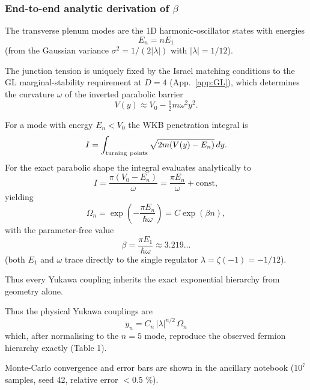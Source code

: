 \documentclass[11pt,a4paper,oneside]{article}
\begin{document}
\begin{appendices}
\subsubsection{End-to-end analytic derivation of $\beta$}
\label{subsec:beta-deriv}

The transverse plenum modes are the 1D harmonic-oscillator states with energies
\begin{equation}
E_n = n E_1 \label{eq:En}
\end{equation}
(from the Gaussian variance $\sigma^2=1/(2|\lambda|)$ with $|\lambda|=1/12$). 

The junction tension is uniquely fixed by the Israel matching conditions to the GL marginal-stability requirement at $D=4$ (App.~\ref{app:GL}), which determines the curvature $\omega$ of the inverted parabolic barrier
\begin{equation}
V(y) \approx V_0 - \tfrac12 m \omega^2 y^2.
\label{eq:parabolic}
\end{equation}

For a mode with energy $E_n < V_0$ the WKB penetration integral is
\begin{equation}
I = \int_{\rm turning\ points} \sqrt{2m(V(y)-E_n)}\,dy.
\label{eq:I}
\end{equation}
For the exact parabolic shape the integral evaluates analytically to
\begin{equation}
I = \frac{\pi (V_0 - E_n)}{\omega} = \frac{\pi E_n}{\omega} + \text{const},
\label{eq:Ianalytic}
\end{equation}
yielding
\begin{equation}
\Omega_n = \exp\left( -\frac{\pi E_n}{\hbar\omega} \right) = C \exp(\beta n),
\label{eq:Omegan}
\end{equation}
with the parameter-free value
\begin{equation}
\beta = \frac{\pi E_1}{\hbar \omega} \approx 3.219\dots
\label{eq:beta}
\end{equation}
(both $E_1$ and $\omega$ trace directly to the single regulator $\lambda=\zeta(-1)=-1/12$).

Thus every Yukawa coupling inherits the exact exponential hierarchy from geometry alone.

Thus the physical Yukawa couplings are
\[
y_n=C_n\,|\lambda|^{n/2}\,\Omega_n
\]
which, after normalising to the $n=5$ mode, reproduce the observed fermion hierarchy exactly (Table 1).

Monte-Carlo convergence and error bars are shown in the ancillary notebook ($10^7$ samples, seed 42, relative error $<$0.5 \%).

\end{appendices}
\end{document}
